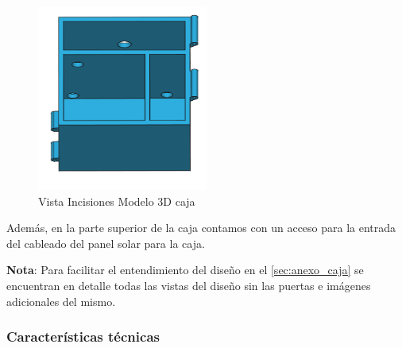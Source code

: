 \begin{figure}[H]
    \centering
    \includegraphics[width=0.5\textwidth]{images/4-DesarrolloTeorico/4-1-caja/CAJA_3D_ACCESOS.png}
    \caption{Vista Incisiones Modelo 3D caja}
    \label{fig:DesarrolloTeorico/Caja/CAJA_3D_ACCESOS}
\end{figure}


Además, en la parte superior de la caja contamos con un acceso para la entrada del cableado del panel solar para la caja.

\textbf{Nota}: Para facilitar el entendimiento del diseño en el \autoref{sec:anexo_caja} se encuentran en detalle todas las vistas del diseño sin las puertas e imágenes adicionales del mismo.

\subsubsection{Características técnicas}

